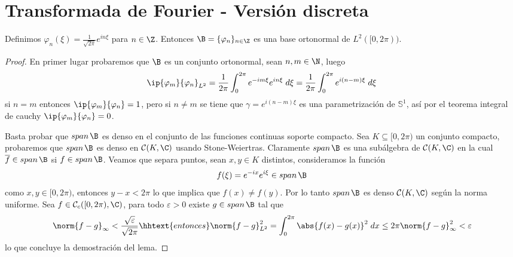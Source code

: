 \documentclass{article}
\begin{document}
\section{Transformada de Fourier - Versión discreta}
\begin{lema}
    Definimos $\varphi_{n}(\xi)=\frac{1}{\sqrt{2\pi}}e^{in\xi}$ para $n\in\Z$. Entonces 
    $\B=\{\varphi_{n}\}_{n\in\Z}$ es una base ortonormal de $L^{2}([0,2\pi))$.
\end{lema}
\begin{proof}
    En primer lugar probaremos que $\B$ es un conjunto ortonormal, sean $n,m\in\N$, luego
    \begin{equation*}
        \ip{\varphi_{m}}{\varphi_{n}}_{L^{2}}
        =\frac{1}{2\pi}\int_{0}^{2\pi}e^{-im\xi}e^{in\xi}\hspace{1mm}d\xi
        =\frac{1}{2\pi}\int_{0}^{2\pi}e^{i(n-m)\xi}\hspace{1mm}d\xi
    \end{equation*}
    si $n=m$ entonces $\ip{\varphi_{m}}{\varphi_{n}}=1$, pero si $n\neq m$ se tiene que 
    $\gamma=e^{i(n-m)\xi}$ es una parametrización de $\mathbb{S}^{1}$, así por el teorema integral
    de cauchy $\ip{\varphi_{m}}{\varphi_{n}}=0$.
    
    \vspace{1mm}
    \noindent Basta probar que $span\hspace{0.5mm}\B$ es denso en el conjunto de las funciones 
    continuas soporte compacto. Sea $K\subseteq[0,2\pi)$ un conjunto compacto, probaremos que 
    $span\hspace{0.5mm}\B$ es denso en $\mathcal{C}(K,\C)$ usando Stone-Weiertras. Claramente
    $span\hspace{0.5mm}\B$ es una subálgebra de $\mathcal{C}(K,\C)$ en la cual 
    $\overline{f}\in span\hspace{0.5mm}\B$ si $f\in span\hspace{0.5mm}\B$. Veamos que separa 
    puntos, sean $x,y\in K$ distintos, consideramos la función
    \begin{equation*}
        f(\xi)=e^{-ix}e^{i\xi}\in span\hspace{0.5mm}\B
    \end{equation*}
    como $x,y\in[0,2\pi)$, entonces $y-x<2\pi$ lo que implica que $f(x)\neq f(y)$. Por lo tanto 
    $span\hspace{0.5mm}\B$ es denso $\mathcal{C}(K,\C)$ según la norma uniforme. Sea 
    $f\in\mathcal{C}_{c}([0,2\pi),\C)$, para todo $\varepsilon>0$ existe 
    $g\in span\hspace{0.5mm}\B$ tal que
    \begin{equation*}
        \norm{f-g}_{\infty}<\frac{\sqrt{\varepsilon}}{\sqrt{2\pi}}
        \hhtext{entonces}
        \norm{f-g}_{L^{2}}^{2}=\int_{0}^{2\pi}\abs{f(x)-g(x)}^{2}\hspace{1mm}dx
        \leq2\pi\norm{f-g}_{\infty}^{2}<\varepsilon
    \end{equation*}
    lo que concluye la demostración del lema.
\end{proof}
\end{document}
